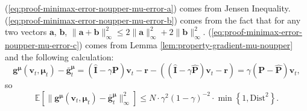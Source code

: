 \documentclass[12pt]{article}
\begin{document}
(\ref{eq:proof-minimax-error-noupper-mu-error-a}) comes from Jensen Inequality. (\ref{eq:proof-minimax-error-noupper-mu-error-b}) comes from the fact that for any two vectors $\boldsymbol{a}$, $\boldsymbol{b}$, $\|\boldsymbol{a}+\boldsymbol{b}\|_{\infty}^2 \le 2 \|\boldsymbol{a}\|_{\infty}^2 + 2 \|\boldsymbol{b}\|_{\infty}^2$. (\ref{eq:proof-minimax-error-noupper-mu-error-c}) comes from Lemma \ref{lem:property-gradient-mu-noupper} and the following calculation:
\begin{equation*}
\boldsymbol{g}^{\boldsymbol{\mu}}(\boldsymbol{v}_t,\boldsymbol{\mu}_t) -\bar{\boldsymbol{g}}_t^{\boldsymbol{\mu}} = (\hat{\boldsymbol{\text{I}}} - \gamma \boldsymbol{\text{P}}) \boldsymbol{v}_{t} - \boldsymbol{\text{r}} - \left((\hat{\boldsymbol{\text{I}}} - \gamma \hat{\boldsymbol{\text{P}}}) \boldsymbol{v}_{t} - \boldsymbol{\text{r}} \right) = \gamma (\boldsymbol{\text{P}} - \hat{\boldsymbol{\text{P}}})\boldsymbol{v}_t,
\end{equation*}
so
\begin{equation*}
    \mathbb{E} \left [\| \boldsymbol{g}^{\boldsymbol{\mu}}(\boldsymbol{v}_t,\boldsymbol{\mu}_t) -\bar{\boldsymbol{g}}_t^{\boldsymbol{\mu}}\|_{\infty}^2\right] \le N \cdot \gamma^2(1-\gamma)^{-2} \cdot \min \left \{1,\text{Dist}^2 \right\}.
\end{equation*}
\end{document}
